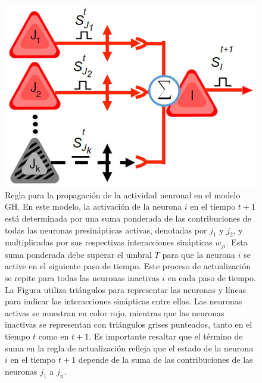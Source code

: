 \begin{figure}[h!]
	\centering\includegraphics[width=\imsize]{reglaautomata}
	\caption[Regla para la propagación de la actividad neuronal en el modelo GH.]{Regla para la propagación de la actividad neuronal en el modelo GH. En este modelo, la activación de la neurona $i$ en el tiempo $t + 1$ está determinada por una suma ponderada de las contribuciones de todas las neuronas presinápticas activas, denotadas por $j_1$ y $j_2$, y multiplicadas por sus respectivas interacciones sinápticas $w_{ji}$. Esta suma ponderada debe superar el umbral $T$ para que la neurona $i$ se active en el siguiente paso de tiempo. Este proceso de actualización se repite para todas las neuronas inactivas $i$ en cada paso de tiempo. La Figura utiliza triángulos para representar las neuronas y líneas para indicar las interacciones sinápticas entre ellas. Las neuronas activas se muestran en color rojo, mientras que las neuronas inactivas se representan con triángulos grises punteados, tanto en el tiempo $t$ como en $t + 1$. Es importante resaltar que el término de suma en la regla de actualización refleja que el estado de la neurona $i$ en el tiempo $t + 1$ depende de la suma de las contribuciones de las neuronas $j_1$ a $j_n$.} 	\label{fig:reglaautomata}
\end{figure}




